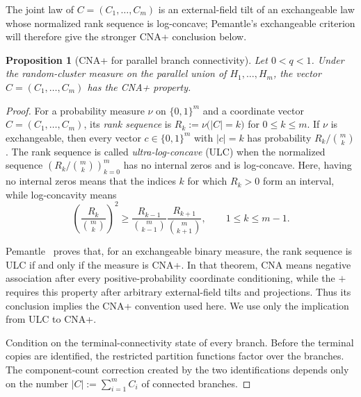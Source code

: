 \documentclass[11pt]{amsart}
\theoremstyle{plain}
\newtheorem{proposition}[theorem]{Proposition}
\theoremstyle{definition}
\theoremstyle{remark}
\begin{document}
The joint law of $C=(C_1,\ldots,C_m)$ is an external-field tilt of an exchangeable law whose normalized rank sequence is log-concave; Pemantle's exchangeable criterion will therefore give the stronger CNA+ conclusion below.

\begin{proposition}[CNA+ for parallel branch connectivity]
\label{prop:parallel-branch-cna}
Let $0<q<1$. Under the random-cluster measure on the parallel union of $H_1,\ldots,H_m$, the vector $C=(C_1,\ldots,C_m)$ has the CNA+ property.
\end{proposition}

\begin{proof}
For a probability measure $\nu$ on $\{0,1\}^m$ and a coordinate vector $C=(C_1,\ldots,C_m)$, its \emph{rank sequence} is $R_k:=\nu\bigl(|C|=k\bigr)$ for $0\le k\le m$. If $\nu$ is exchangeable, then every vector $c\in\{0,1\}^m$ with $|c|=k$ has probability $R_k/\binom{m}{k}$. The rank sequence is called \emph{ultra-log-concave} (ULC) when the normalized sequence $\left(R_k/\binom{m}{k}\right)_{k=0}^m$ has no internal zeros and is log-concave. Here, having no internal zeros means that the indices $k$ for which $R_k>0$ form an interval, while log-concavity means
\[
    \left(
        \frac{R_k}{\binom{m}{k}}
    \right)^2
    \ge
    \frac{R_{k-1}}{\binom{m}{k-1}}
    \frac{R_{k+1}}{\binom{m}{k+1}},
    \qquad 1\le k\le m-1.
\]

Pemantle~\cite[Theorem~2.7]{pemantle2000towards} proves that, for an exchangeable binary measure, the rank sequence is ULC if and only if the measure is CNA+. In that theorem, CNA means negative association after every positive-probability coordinate conditioning, while the $+$ requires this property after arbitrary external-field tilts and projections. Thus its conclusion implies the CNA+ convention used here. We use only the implication from ULC to CNA+.

Condition on the terminal-connectivity state of every branch. Before the terminal copies are identified, the restricted partition functions factor over the branches. The component-count correction created by the two identifications depends only on the number $|C|:=\sum_{i=1}^m C_i$ of connected branches.


\end{proof}
\end{document}
